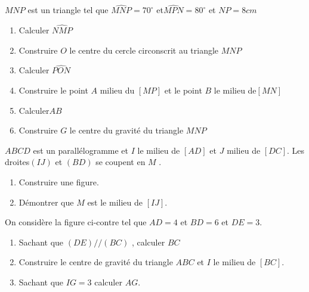 \documentclass[a4paper,12pt]{article}
\begin{document}
\devoir[ds=false,num=3 ,niv=2 , date=05/01/2023,Rdate=09/01/2023,prv=true ]

\begin{exo}
$MNP$ est un triangle tel que  $\widehat{MNP}=70^{\circ}$ et$\widehat{MPN}=80^{\circ}$ et $NP=8 cm$
\begin{enumerate}
\item Calculer $\widehat{NMP}$
\item Construire  $O$ le centre du cercle circonscrit au triangle $MNP$
\item Calculer $\widehat{PON}$
\item Construire le point  $A$ milieu du  $[MP]$ et le point $B$ le milieu de$[MN]$
\item Calculer$AB$
\item Construire $G$ le centre du gravité du triangle $MNP$

\end{enumerate}

\end{exo}

\begin{exo}
$ABCD$ est un parallélogramme et  $I$ le milieu de  $[AD]$ et $J$ milieu de $[DC]$. Les droites$(IJ)$ et $(BD)$ se coupent en  $M$ .
\begin{enumerate}
\item Construire une figure.
\item Démontrer que $M$ est le milieu de $[IJ]$.
\end{enumerate}
\end{exo}

\begin{exo}
\begin{minipage}{0.6\linewidth}

On considère la figure ci-contre tel que $AD=4$ et $BD=6$ et $DE=3$. 
\begin{enumerate}
\item Sachant que $(DE)//(BC)$ , calculer $BC$
\item Construire le centre de gravité du triangle $ABC$ et $I$ le milieu de $[BC]$.
\item Sachant que  $IG=3$ calculer $AG$.
\end{enumerate}
\end{minipage}
\begin{minipage}{0.4\linewidth}
\end{minipage}
\end{exo}
\newpage
\end{document}
